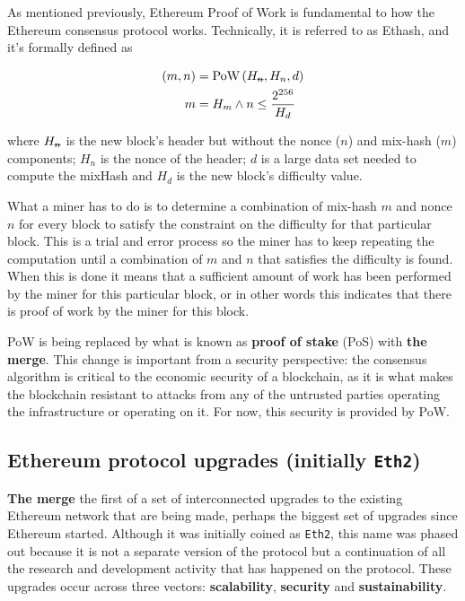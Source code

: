 As mentioned previously, Ethereum Proof of Work is fundamental to how
the Ethereum consensus protocol works. Technically, it is referred to as
Ethash, and it's formally defined as

\begin{align*}
(m,n)&=\text{PoW}\left(H_{\stkout{n}},H_n,d\right)\\ m&=H_m\wedge n\leq\frac{2^{256}}{H_d}
\end{align*}

where $H_\stkout{n}$ is the new block's header but without the nonce ($n$)
and mix-hash ($m$) components; $H_n$ is the nonce of the header;
$d$ is a large data set needed to compute the mixHash and $H_d$ is
the new block's difficulty value.

What a miner has to do is to determine a combination of mix-hash $m$
and nonce $n$ for every block to satisfy the constraint on the
difficulty for that particular block. This is a trial and error process
so the miner has to keep repeating the computation until a combination
of $m$ and $n$ that satisfies the difficulty is found. When this is
done it means that a sufficient amount of work has been performed by the
miner for this particular block, or in other words this indicates that
there is proof of work by the miner for this block.

PoW is being replaced by what is known as \textbf{proof of stake} (PoS)
with \textbf{the merge}. This change is important from a security
perspective: the consensus algorithm is critical to the economic
security of a blockchain, as it is what makes the blockchain resistant
to attacks from any of the untrusted parties operating the
infrastructure or operating on it. For now, this security is provided by
PoW.

\subsection{\texorpdfstring{Ethereum protocol upgrades (initially
\texttt{Eth2})}{Ethereum protocol upgrades (initially Eth2)}}\label{ethereum-protocol-upgrades-initially-eth2}

\textbf{The merge} the first of a set of interconnected upgrades to the
existing Ethereum network that are being made, perhaps the biggest set
of upgrades since Ethereum started. Although it was initially coined as
\texttt{Eth2}, this name was phased out because it is not a separate
version of the protocol but a continuation of all the research and
development activity that has happened on the protocol. These upgrades
occur across three vectors: \textbf{scalability}, \textbf{security} and
\textbf{sustainability}.


